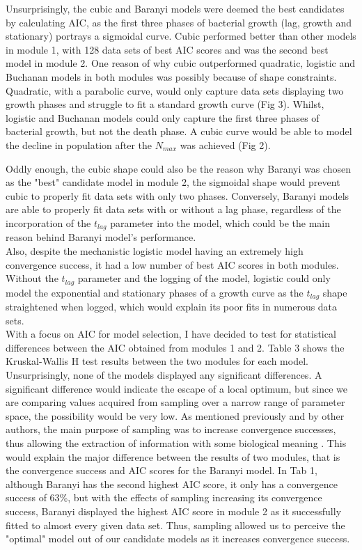 \documentclass[11pt, a4paper]{article} %
\begin{document}
\noindent Unsurprisingly, the cubic and Baranyi models were deemed the best candidates by calculating AIC, as the first three phases of bacterial growth  (lag, growth and stationary) portrays a sigmoidal curve. Cubic performed better than other models in module 1, with 128 data sets of best AIC scores and was the second best model in module 2. One reason of why cubic outperformed quadratic, logistic and Buchanan models in both modules was possibly because of shape constraints. Quadratic, with a parabolic curve, would only capture data sets displaying two growth phases and struggle to fit a standard growth curve (Fig 3). Whilst, logistic and Buchanan models could only capture the first three phases of bacterial growth, but not the death phase. A cubic curve would be able to model the decline in population after the $N_{max}$ was achieved (Fig 2). \\

\newpage

\noindent Oddly enough, the cubic shape could also be the reason why Baranyi was chosen as the "best" candidate model in module 2, the sigmoidal shape would prevent cubic to properly fit data sets with only two phases. Conversely, Baranyi models are able to properly fit data sets with or without a lag phase, regardless of the incorporation of the $t_{lag}$ parameter into the model, which could be the main reason behind Baranyi model's performance. \\

\noindent Also, despite the mechanistic logistic model having an extremely high convergence success, it had a low number of best AIC scores in both modules. Without the $t_{lag}$ parameter and the logging of the model, logistic could only model the exponential and stationary phases of a growth curve as the $t_{lag}$ shape straightened when logged, which would explain its poor fits in numerous data sets.\\

\noindent With a focus on AIC for model selection, I have decided to test for statistical differences between the AIC obtained from modules 1 and 2. Table 3 shows the Kruskal-Wallis H test results between the two modules for each model. Unsurprisingly, none of the models displayed any significant differences. A significant difference would indicate the escape of a local optimum, but since we are comparing values acquired from sampling over a narrow range of parameter space, the possibility would be very low. As mentioned previously and by other authors, the main purpose of sampling was to increase convergence successes, thus allowing the extraction of information with some biological meaning \cite{gabor2015robust}. This would  explain the major difference between the results of two modules, that is the convergence success and AIC scores for the Baranyi model. In Tab 1, although Baranyi has the second highest AIC score, it only has a convergence success of 63\%, but with the effects of sampling increasing its convergence success, Baranyi displayed the highest AIC score in module 2 as it successfully fitted to almost every given data set. Thus, sampling allowed us to perceive the "optimal" model out of our candidate models as it increases convergence success.\\
\end{document}
